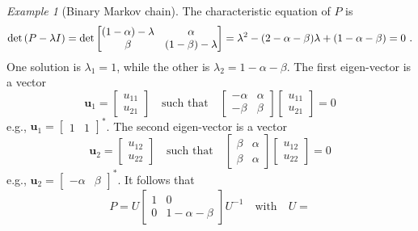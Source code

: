 \documentclass[12pt,a4paper]{amsart}
\theoremstyle{plain}%
\theoremstyle{definition}
\theoremstyle{remark}
\newtheorem{example}{Example}
\begin{document}
\begin{example}[Binary Markov chain]
The characteristic equation of $P$ is
\begin{equation*}
  \operatorname{det}\left(P - \lambda I\right) = \det
  \begin{bmatrix}
    (1 - \alpha) - \lambda & \alpha \\ \beta & (1-\beta) - \lambda 
  \end{bmatrix} = \lambda^2 - (2-\alpha-\beta)\lambda + (1-\alpha-\beta) = 0 \ .
\end{equation*}
One solution is $\lambda_1 = 1$, while the other is $\lambda_2 = 1 - \alpha - \beta$.
The first eigen-vector is a vector
\begin{equation*}
  \bm u_1 =
  \begin{bmatrix}
   u_{11} \\ u_{21}   
  \end{bmatrix}
\quad \text{such that} \quad 
  \begin{bmatrix}
  -\alpha & \alpha \\ -\beta & \beta 
\end{bmatrix}
\begin{bmatrix}
  u_{11} \\ u_{21}
\end{bmatrix} = 0
\end{equation*}
e.g., $\bm u_1 =
\begin{bmatrix}
  1 & 1
\end{bmatrix}^*$. The second eigen-vector is a vector
\begin{equation*}
  \bm u_2 =
  \begin{bmatrix}
   u_{12} \\ u_{22}   
  \end{bmatrix}
\quad \text{such that} \quad 
  \begin{bmatrix}
 \beta & \alpha \\ \beta & \alpha 
\end{bmatrix}
\begin{bmatrix}
  u_{12} \\ u_{22}
\end{bmatrix} = 0
\end{equation*}
e.g., $\bm u_2 =
\begin{bmatrix}
  -\alpha & \beta
\end{bmatrix}^*$. It follows that
\begin{equation*}
  P = U \begin{bmatrix} 1 & 0 \\ 0 & 1-\alpha-\beta
  \end{bmatrix} U^{-1} \quad \text{with} \quad U =

\end{equation*}
\end{example}
\end{document}
